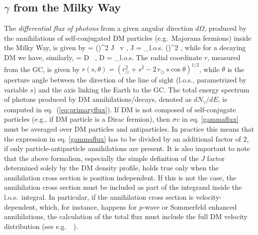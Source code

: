 \subsection{$\gamma$ from the Milky Way}
\label{sec:IDgammaMW}
The {\em differential flux of photons} from a given angular direction $d\Omega$, produced by the annihilations of self-conjugated DM particles (e.g.\ Majorana fermions) inside the Milky Way, is given by
\beq 
\label{gammaflux}
 =  \left(\right)^2  J \, \langle \sigma v\rangle 
{}  ,\qquad
J = \int_{\rm l.o.s.}  \left(\right)^2 ,
\eeq
while for a decaying DM we have, similarly, 
\beq 
\label{gammafluxdec}
 =   D \, \Gamma
{}  ,\qquad
D = \int_{\rm l.o.s.}    
\eeq
The radial coordinate $r$, measured from the GC, is given by $r(s,\theta)=(r_\odot^2+s^2-2\,r_\odot\,s\cos\theta)^{1/2}$, while $\theta$ is the aperture angle between the direction of the line of sight (l.o.s., parametrized by variable $s$) and the axis linking the Earth to the GC.
The total energy spectrum of photons produced by DM annihilations/decays, denoted as $dN_\gamma/dE$, is computed in eq.~(\ref{eq:primaryflux}).
If DM is not composed of self-conjugate particles (e.g., if DM particle is a Dirac fermion), then $\sigma v$ in eq. \eqref{gammaflux} must be averaged over DM particles and antiparticles. 
In practice this means that the expression in eq. \eqref{gammaflux} has to be divided by an additional factor of 2, if only particle-antiparticle annihilations are present.
It is also important to note that the above formalism, especially the simple definition of the $J$ factor determined solely by the DM density profile, holds true only when the annihilation cross section is
position independent. If this is not the case, the annihilation cross section must be included as part of the integrand inside the l.o.s.~integral. In particular, if the annihilation cross section is velocity-dependent, which, for instance, happens for $p$-wave or Sommerfeld enhanced annihilations, the calculation of the total flux must include the full DM velocity distribution (see e.g.~~\cite{Boucher:2021mii}).

